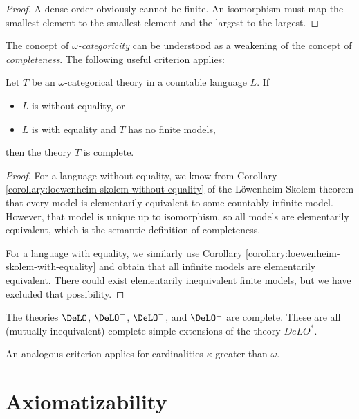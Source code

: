 \begin{proof}
A dense order obviously cannot be finite. An isomorphism must map the smallest element to the smallest element and the largest to the largest.
\end{proof}

The concept of \emph{$\omega$-categoricity} can be understood as a weakening of the concept of \emph{completeness}. The following useful criterion applies:

\begin{theorem}
Let $T$ be an $\omega$-categorical theory in a countable language $L$. If
\begin{itemize}
    \item $L$ is without equality, or
    \item $L$ is with equality and $T$ has no finite models,
\end{itemize}
then the theory $T$ is complete.
\end{theorem}
\begin{proof}
For a language without equality, we know from Corollary \ref{corollary:loewenheim-skolem-without-equality} of the Löwenheim-Skolem theorem that every model is elementarily equivalent to some countably infinite model. However, that model is unique up to isomorphism, so all models are elementarily equivalent, which is the semantic definition of completeness.

For a language with equality, we similarly use Corollary \ref{corollary:loewenheim-skolem-with-equality} and obtain that all infinite models are elementarily equivalent. There could exist elementarily inequivalent finite models, but we have excluded that possibility.
\end{proof}

\begin{corollary}\label{corollary:complete-simple-extensions-of-delo}
    The theories $\DeLO$, $\DeLO^+$, $\DeLO^-$, and $\DeLO^\pm$ are complete. These are all (mutually inequivalent) complete simple extensions of the theory $DeLO^*$.
\end{corollary}

\begin{remark}
An analogous criterion applies for cardinalities $\kappa$ greater than $\omega$.
\end{remark}

\section{Axiomatizability}\label{section:axiomatizability}

